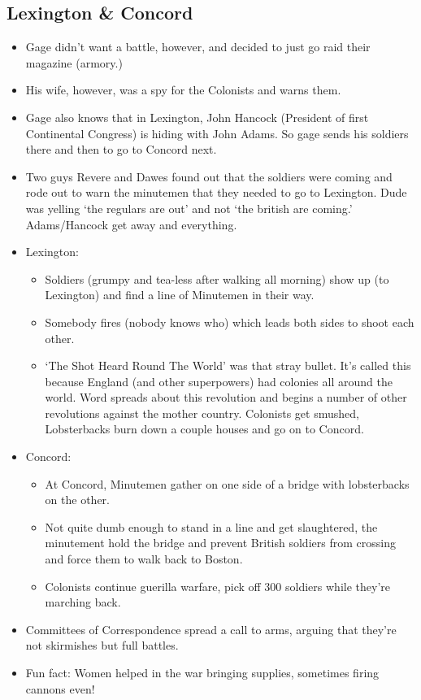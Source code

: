 \documentclass{article}
\begin{document}
    \subsection{Lexington \& Concord}
      \begin{itemize}
        \item Gage didn't want a battle, however, and decided to just go raid their magazine (armory.)
        \item His wife, however, was a spy for the Colonists and warns them.
        \item  Gage also knows that in Lexington, John Hancock (President of first Continental Congress) is hiding with John Adams. So gage sends his soldiers there and then to go to Concord next.
        \item Two guys Revere and Dawes found out that the soldiers were coming and rode out to warn the minutemen that they needed to go to Lexington. Dude was yelling `the regulars are out' and not `the british are coming.' Adams/Hancock get away and everything.
        \item Lexington:
          \begin{itemize}
            \item Soldiers (grumpy and tea-less after walking all morning) show up (to Lexington) and find a line of Minutemen in their way.
            \item Somebody fires (nobody knows who) which leads both sides to shoot each other.
            \item `The Shot Heard Round The World' was that stray bullet. It's called this because England (and other superpowers) had colonies all around the world. Word spreads about this revolution and begins a number of other revolutions against the mother country.
            Colonists get smushed, Lobsterbacks burn down a couple houses and go on to Concord.
          \end{itemize}
        \item Concord:
          \begin{itemize}
            \item At Concord, Minutemen gather on one side of a bridge with lobsterbacks on the other.
            \item Not quite dumb enough to stand in a line and get slaughtered, the minutement hold the bridge and prevent British soldiers from crossing and force them to walk back to Boston.
            \item Colonists continue guerilla warfare, pick off 300 soldiers while they're marching back.
          \end{itemize}
        \item Committees of Correspondence spread a call to arms, arguing that they're not skirmishes but full battles.
        \item Fun fact: Women helped in the war bringing supplies, sometimes firing cannons even!
      \end{itemize}
\end{document}
